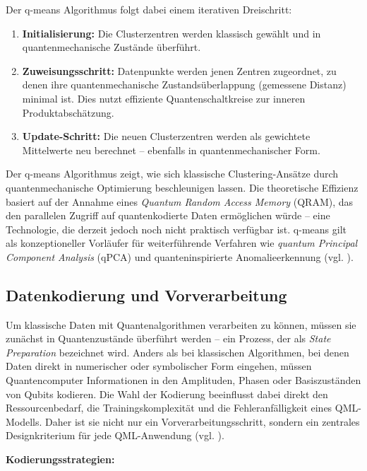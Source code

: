 Der q-means Algorithmus folgt dabei einem iterativen Dreischritt:  
\begin{enumerate}
  \item \textbf{Initialisierung:} Die Clusterzentren werden klassisch gewählt und in quantenmechanische Zustände überführt.
  \item \textbf{Zuweisungsschritt:} Datenpunkte werden jenen Zentren zugeordnet, zu denen ihre quantenmechanische Zustandsüberlappung (gemessene Distanz) minimal ist. Dies nutzt effiziente Quantenschaltkreise zur inneren Produktabschätzung.
  \item \textbf{Update-Schritt:} Die neuen Clusterzentren werden als gewichtete Mittelwerte neu berechnet – ebenfalls in quantenmechanischer Form.
\end{enumerate}  

Der q-means Algorithmus zeigt, wie sich klassische Clustering-Ansätze durch quantenmechanische Optimierung beschleunigen lassen. Die theoretische Effizienz basiert auf der Annahme eines \textit{Quantum Random Access Memory} (QRAM), das den parallelen Zugriff auf quantenkodierte Daten ermöglichen würde – eine Technologie, die derzeit jedoch noch nicht praktisch verfügbar ist. q-means gilt als konzeptioneller Vorläufer für weiterführende Verfahren wie \textit{quantum Principal Component Analysis} (qPCA) und quanteninspirierte Anomalieerkennung (vgl. \cite{kerenidis_q-means_2019}).

\vspace{0.5cm}
\subsection{Datenkodierung und Vorverarbeitung}  
Um klassische Daten mit Quantenalgorithmen verarbeiten zu können, müssen sie zunächst in Quantenzustände überführt werden – ein Prozess, der als \textit{State Preparation} bezeichnet wird. Anders als bei klassischen Algorithmen, bei denen Daten direkt in numerischer oder symbolischer Form eingehen, müssen Quantencomputer Informationen in den Amplituden, Phasen oder Basiszuständen von Qubits kodieren. Die Wahl der Kodierung beeinflusst dabei direkt den Ressourcenbedarf, die Trainingskomplexität und die Fehleranfälligkeit eines QML-Modells. Daher ist sie nicht nur ein Vorverarbeitungsschritt, sondern ein zentrales Designkriterium für jede QML-Anwendung (vgl. \cite{schuld_introduction_2015}).

\vspace{0.3cm}

\textbf{Kodierungsstrategien:}  

